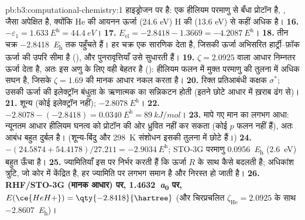 \begin{solution}{pb:b3:computational-chemistry:1}
हाइड्रोजन पर है:  एक हीलियम परमाणु से बँधा प्रोटॉन है, , जैसा
अपेक्षित है, क्योंकि He की आयनन ऊर्जा (24.6 eV) H की (13.6 eV) से कहीं अधिक है।
\textbf{16.} $-\varepsilon_1 = \qty{1.633}{\hartree} = \qty{44.4}{eV}$।
\textbf{17.} $E_{\mathrm{el}} = -2.8418 - 1.3669 = \qty{-4.2087}{\hartree}$।
\textbf{18.} तीन चक्र \qty{-2.8418}{\hartree} तक पहुँचते हैं। हर चक्र एक
सारणिक देता है, जिसकी ऊर्जा अभिसरित हार्ट्री--फ़ॉक
ऊर्जा की उपरि सीमा है (), और पुनरावृत्तियाँ उसे सुधारती हैं।
\textbf{19.} $\zeta = 2.0925$ वाला आधार निम्नतर ऊर्जा देता है, अतः इस अणु के लिए वही
बेहतर है (): हीलियम फलन
 में मुक्त परमाणु की तुलना में अधिक सघन है, जिसके $\zeta = 1.69$ की
मानक आधार नकल करता है।
\textbf{20.} रिक्त प्रतिआबंधी कक्षक $\sigma^*$; उसकी ऊर्जा  की इलेक्ट्रॉन
बंधुता के ऋणात्मक का सन्निकटन होती (इतने छोटे आधार में ख़राब ढंग से)।
\textbf{21.} शून्य (कोई इलेक्ट्रॉन नहीं); $\qty{-2.8078}{\hartree}$।
\textbf{22.} $-2.8078 - (-2.8418) = \qty{0.0340}{\hartree} = \qty{89}{kJ/mol}$।
\textbf{23.} मापे गए मान का लगभग आधा: न्यूनतम आधार हीलियम घनत्व को
प्रोटॉन की ओर ध्रुवित नहीं कर सकता (कोई $p$ फलन नहीं हैं), अतः आबंध
बहुत दुर्बल है। (शून्य-बिंदु और \qty{298}{K} संशोधन इसकी तुलना में छोटे हैं।)
\textbf{24.} $-(24.5874 + 54.4178)/27.211 = \qty{-2.9034}{\hartree}$; STO-3G परमाणु
\qty{0.0956}{\hartree} (\qty{2.6}{eV}) बहुत ऊँचा है।
\textbf{25.} ज्यामितियाँ इस पर निर्भर करती हैं कि ऊर्जा $R$ के साथ कैसे बदलती है; अधिकांश
त्रुटि, जो कोर में केंद्रित है, हर ज्यामिति पर लगभग समान है और
निरस्त हो जाती है।
\textbf{26.} \textbf{RHF/STO-3G (मानक आधार) पर, \qty{1.4632}{\bohr} पर,
$E(\ce{HeH+}) = \qty{-2.8418}{\hartree}$} (और चिरप्रचलित
$\zeta_{\mathrm{He}} = 2.0925$ के साथ \qty{-2.8607}{\hartree})।
\end{solution}
